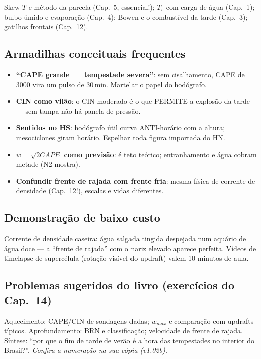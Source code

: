 Skew-$T$ e método da parcela (Cap.~5, essencial!); $T_v$ com carga de
água (Cap.~1); bulbo úmido e evaporação (Cap.~4); Bowen e o
combustível da tarde (Cap.~3); gatilhos frontais (Cap.~12).

\subsection*{Armadilhas conceituais frequentes}

\begin{itemize}
  \item \textbf{``CAPE grande $=$ tempestade severa''}: sem
        cisalhamento, CAPE de 3000 vira um pulso de 30\,min. Martelar
        o papel do hodógrafo.
  \item \textbf{CIN como vilão}: o CIN moderado é o que PERMITE a
        explosão da tarde — sem tampa não há panela de pressão.
  \item \textbf{Sentidos no HS}: hodógrafo útil curva ANTI-horário com
        a altura; mesociclones giram horário. Espelhar toda figura
        importada do HN.
  \item \textbf{$w = \sqrt{2CAPE}$ como previsão}: é teto teórico;
        entranhamento e água cobram metade (N2 mostra).
  \item \textbf{Confundir frente de rajada com frente fria}: mesma
        física de corrente de densidade (Cap.~12!), escalas e vidas
        diferentes.
\end{itemize}

\subsection*{Demonstração de baixo custo}

Corrente de densidade caseira: água salgada tingida despejada num
aquário de água doce — a ``frente de rajada'' com o nariz elevado
aparece perfeita. Vídeos de timelapse de supercélula (rotação visível
do updraft) valem 10 minutos de aula.

\subsection*{Problemas sugeridos do livro (exercícios do Cap.~14)}

Aquecimento: CAPE/CIN de sondagens dadas; $w_{max}$ e comparação com
updrafts típicos. Aprofundamento: BRN e classificação; velocidade de
frente de rajada. Síntese: ``por que o fim de tarde de verão é a hora
das tempestades no interior do Brasil?''.
\emph{Confira a numeração na sua cópia (v1.02b).}

